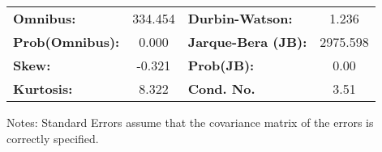 \begin{center}
\begin{tabular}{lcccccc}
\bottomrule
\end{tabular}
\begin{tabular}{lclc}
\textbf{Omnibus:}       & 334.454 & \textbf{  Durbin-Watson:     } &    1.236  \\
\textbf{Prob(Omnibus):} &   0.000 & \textbf{  Jarque-Bera (JB):  } & 2975.598  \\
\textbf{Skew:}          &  -0.321 & \textbf{  Prob(JB):          } &     0.00  \\
\textbf{Kurtosis:}      &   8.322 & \textbf{  Cond. No.          } &     3.51  \\
\bottomrule
\end{tabular}
\end{center}

Notes: \newline
 [1] Standard Errors assume that the covariance matrix of the errors is correctly specified.